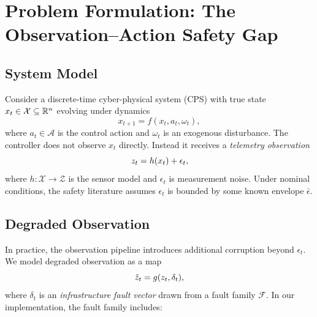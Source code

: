 \section{Problem Formulation: The Observation--Action Safety Gap}\label{sec:problem}

\subsection{System Model}

Consider a discrete-time cyber-physical system (CPS) with true state
$x_t \in \mathcal{X} \subseteq \mathbb{R}^n$ evolving under dynamics
\begin{equation}\label{eq:dynamics}
  x_{t+1} = f(x_t, a_t, \omega_t),
\end{equation}
where $a_t \in \mathcal{A}$ is the control action and $\omega_t$ is an exogenous
disturbance.  The controller does not observe $x_t$ directly.  Instead it receives a
\emph{telemetry observation}
\begin{equation}\label{eq:observation}
  z_t = h(x_t) + \epsilon_t,
\end{equation}
where $h : \mathcal{X} \to \mathcal{Z}$ is the sensor model and
$\epsilon_t$ is measurement noise.  Under nominal conditions, the safety literature
assumes $\epsilon_t$ is bounded by some known envelope $\bar\epsilon$.

\subsection{Degraded Observation}

In practice, the observation pipeline introduces additional corruption beyond
$\epsilon_t$.  We model degraded observation as a map
\begin{equation}\label{eq:degraded}
  \tilde{z}_t = g(z_t, \delta_t),
\end{equation}
where $\delta_t$ is an \emph{infrastructure fault vector} drawn from a fault family
$\mathcal{F}$.  In our implementation, the fault family includes:

